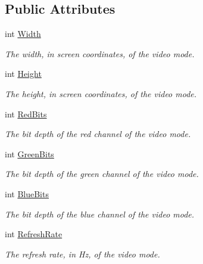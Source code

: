 \subsection*{Public Attributes}
\begin{DoxyCompactItemize}
\item 
int \mbox{\hyperlink{struct_glfw3_1_1_glfw_1_1_video_mode_a1f3cba74260bd3f171d70255f98a1e9b}{Width}}
\begin{DoxyCompactList}\small\item\em The width, in screen coordinates, of the video mode. \end{DoxyCompactList}\item 
int \mbox{\hyperlink{struct_glfw3_1_1_glfw_1_1_video_mode_aa34de731c01a837a081af6b5d91062f1}{Height}}
\begin{DoxyCompactList}\small\item\em The height, in screen coordinates, of the video mode. \end{DoxyCompactList}\item 
int \mbox{\hyperlink{struct_glfw3_1_1_glfw_1_1_video_mode_a771615384f780b5d3ceb33dec6f139be}{Red\+Bits}}
\begin{DoxyCompactList}\small\item\em The bit depth of the red channel of the video mode. \end{DoxyCompactList}\item 
int \mbox{\hyperlink{struct_glfw3_1_1_glfw_1_1_video_mode_a13265ea5710f1dba7a1a1ece44002d68}{Green\+Bits}}
\begin{DoxyCompactList}\small\item\em The bit depth of the green channel of the video mode. \end{DoxyCompactList}\item 
int \mbox{\hyperlink{struct_glfw3_1_1_glfw_1_1_video_mode_a70df9c85fd74b2e9e225ec478aaa44d5}{Blue\+Bits}}
\begin{DoxyCompactList}\small\item\em The bit depth of the blue channel of the video mode. \end{DoxyCompactList}\item 
int \mbox{\hyperlink{struct_glfw3_1_1_glfw_1_1_video_mode_ab86d4f450f14b35aa0a9bb79b11b2480}{Refresh\+Rate}}
\begin{DoxyCompactList}\small\item\em The refresh rate, in Hz, of the video mode. \end{DoxyCompactList}\end{DoxyCompactItemize}


